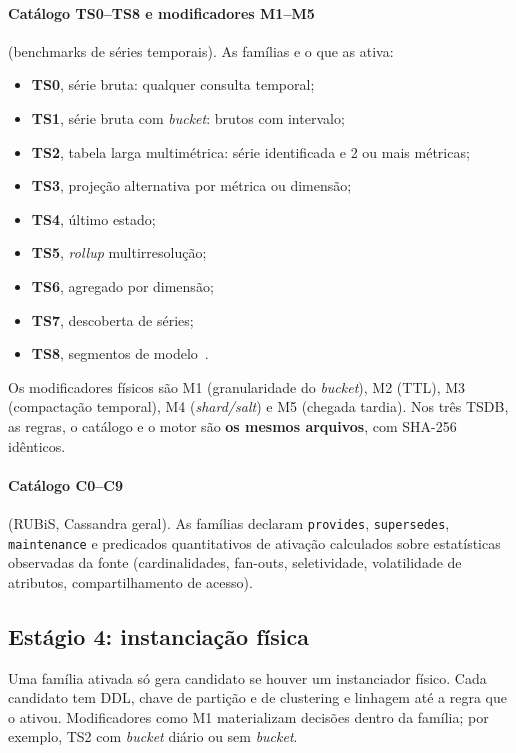 \documentclass[10pt,a4paper,twoside]{article}
\theoremstyle{definition}\newtheorem{definicao}{Definição}
\begin{document}
\paragraph{Catálogo TS0--TS8 e modificadores M1--M5} (benchmarks de séries temporais). As famílias e o que as ativa:
\begin{itemize}
\item \textbf{TS0}, série bruta: qualquer consulta temporal;
\item \textbf{TS1}, série bruta com \emph{bucket}: brutos com intervalo;
\item \textbf{TS2}, tabela larga multimétrica: série identificada e 2 ou mais métricas;
\item \textbf{TS3}, projeção alternativa por métrica ou dimensão;
\item \textbf{TS4}, último estado;
\item \textbf{TS5}, \emph{rollup} multirresolução;
\item \textbf{TS6}, agregado por dimensão;
\item \textbf{TS7}, descoberta de séries;
\item \textbf{TS8}, segmentos de modelo~\cite{modelardb}.
\end{itemize}
Os modificadores físicos são M1 (granularidade do \emph{bucket}), M2 (TTL), M3 (compactação temporal), M4 (\emph{shard/salt}) e M5 (chegada tardia). Nos três TSDB, as regras, o catálogo e o motor são \textbf{os mesmos arquivos}, com SHA-256 idênticos.

\paragraph{Catálogo C0--C9} (RUBiS, Cassandra geral). As famílias declaram \texttt{provides}, \texttt{supersedes}, \texttt{maintenance} e predicados quantitativos de ativação calculados sobre estatísticas observadas da fonte (cardinalidades, fan-outs, seletividade, volatilidade de atributos, compartilhamento de acesso).

\subsection{Estágio 4: instanciação física}
Uma família ativada só gera candidato se houver um instanciador físico. Cada candidato tem DDL, chave de partição e de clustering e linhagem até a regra que o ativou. Modificadores como M1 materializam decisões dentro da família; por exemplo, TS2 com \emph{bucket} diário ou sem \emph{bucket}.
\end{document}

